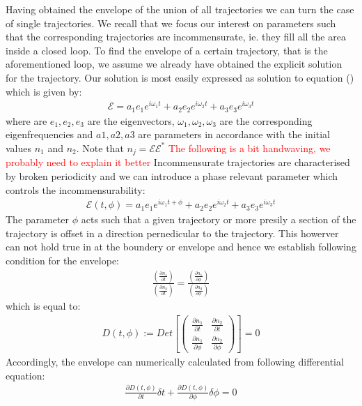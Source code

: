 \documentclass[9pt,twocolumn,twoside]{osajnl}
\begin{document}
Having obtained the envelope of the union of all trajectories we 
can turn the case of single trajectories. We recall that we 
focus our interest on parameters such that the corresponding 
trajectories are incommensurate, ie. they fill all the area inside
a closed loop. To find the envelope of a certain trajectory, that 
is the aforementioned loop, we assume we
already have obtained 
the explicit solution for the trajectory.
Our solution is most easily expressed as 
solution to equation () which is given by:
\begin{eqnarray}
\mathcal{E} = a_1 e_1 e^{i \omega_1 t} + a_2 e_2 e^{i \omega_2 t} +a_3 e_3 e^{i \omega_3 t} 
\end{eqnarray}
where are $e_1,e_2,e_3$ are the eigenvectors, 
$\omega_1, \omega_2,\omega_3$ are the 
corresponding eigenfrequencies and $a1, a2, a3$ are parameters in accordance with the initial values $n_1$ and $n_2$. Note 
that $n_j = \mathcal{E}\mathcal{E^*}$
\textcolor{red}{The following is a bit handwaving, we probably need to explain it better}
Incommensurate trajectories are 
characterised by broken periodicity and 
we can introduce a phase relevant parameter which controls the incommensurability: 
\begin{eqnarray}
\mathcal{E}(t, \phi) = a_1 e_1 e^{i \omega_1 t + \phi} + a_2 e_2 e^{i \omega_2 t} +a_3 e_3 e^{i \omega_3 t} 
\end{eqnarray}
The parameter $\phi$ acts such that 
a given trajectory or more presily a section of the trajectory is offset in a
direction pernedicular to the trajectory.
This howerver can not hold true in at the 
boundery or envelope and hence we establish
following condition for the envelope:
\begin{eqnarray}
\frac{ (\frac{\partial n_1}{\partial t}) }{ (\frac{\partial n_2}{\partial t}) } = \frac{( \frac{\partial n_1}{\partial \phi})}{(\frac{\partial n_2}{\partial \phi}) } 	
\end{eqnarray}
which is equal to:
\begin{eqnarray}
D(t, \phi):=Det[\left(  \begin{array}{cc} 
\frac{\partial n_1}{\partial t} & \frac{\partial n_2}{\partial t} \\
\frac{\partial n_1}{\partial \phi} & \frac{\partial n_2}{\partial \phi} 
\end{array} \right)] = 0
\end{eqnarray}
Accordingly, the envelope can numerically
calculated from following differential equation:
\begin{eqnarray}
\frac{\partial D(t,\phi)}{\partial t} \delta t +
\frac{\partial D(t,\phi)}{\partial \phi} \delta \phi = 0
\end{eqnarray}
\end{document}
